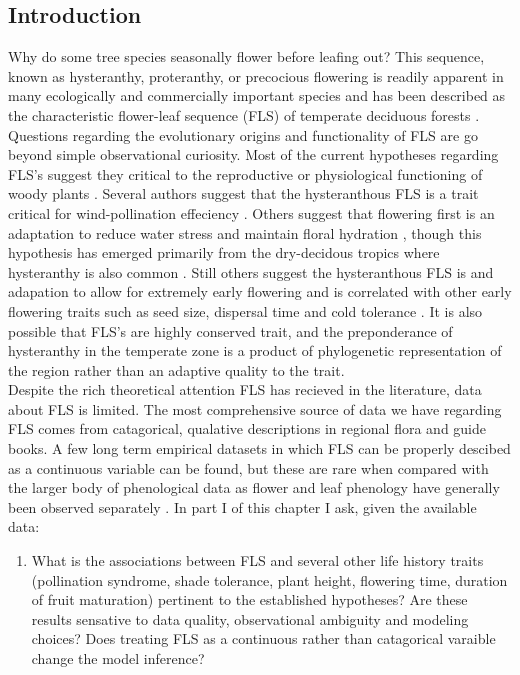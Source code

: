 \documentclass{article}\usepackage[]{graphicx}\usepackage[]{color}
\begin{document}
\subsection*{Introduction}
\indent\indent Why do some tree species seasonally flower before leafing out? This sequence, known as hysteranthy, proteranthy, or precocious flowering is readily apparent in many ecologically and commercially important species and has been described as  the characteristic flower-leaf sequence (FLS) of temperate deciduous forests \citep{Rathcke1985}. Questions regarding the evolutionary origins and functionality of FLS are go beyond simple observational curiosity. Most of the current hypotheses regarding FLS's suggest they critical to the reproductive or physiological functioning of woody plants \citep{Gougherty2018}. Several authors suggest that the hysteranthous FLS is a trait critical for wind-pollination effeciency \citep{Whitehead1969,Friedman2009}. Others suggest that flowering first is an adaptation to reduce water stress and maintain floral hydration \citep{Franklin2016}, though this hypothesis has emerged primarily from the dry-decidous tropics where hysteranthy is also common \citep{Janzen1967,Franklin2016}.  Still others suggest the hysteranthous FLS is and adapation to allow for extremely early flowering and is correlated with other early flowering traits such as seed size, dispersal time and cold tolerance \citep{Gougherty2018,Bolmgren2003,Primack1987}. It is also possible that FLS's are highly conserved trait, and the preponderance of hysteranthy in the temperate zone is a product of phylogenetic representation of the region rather than an adaptive quality to the trait.\\
\indent Despite the rich theoretical attention FLS has recieved in the literature, data about FLS is limited. The most comprehensive source of data we have regarding FLS comes from catagorical, qualative descriptions in regional flora and guide books. A few long term empirical datasets in which FLS can be properly descibed as a continuous variable can be found, but these are rare when compared with the larger body of phenological data as flower and leaf phenology have generally been observed separately \citep{Wolkovich2014}. In part I of this chapter I ask, given the available data:
\begin{enumerate}
\item  What is the associations between FLS and several other life history traits (pollination syndrome, shade tolerance, plant height, flowering time, duration of fruit maturation) pertinent to the established hypotheses? Are these results sensative to data quality, observational ambiguity and modeling choices? Does treating FLS as a continuous rather than catagorical varaible change the model inference?
\end{enumerate}
\end{document}

